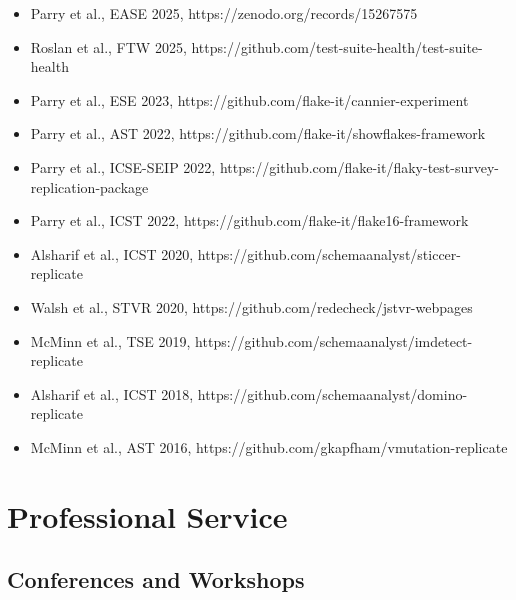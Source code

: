 \documentclass[11pt,letterpaper,sans]{moderncv}
\begin{document}
\begin{itemize} \renewcommand\labelitemi{\Large\textbullet}

  \setlength\itemsep{0.5em}

  \item Parry et al., EASE 2025, https://zenodo.org/records/15267575

  \item Roslan et al., FTW 2025, https://github.com/test-suite-health/test-suite-health

  \item Parry et al., ESE 2023, https://github.com/flake-it/cannier-experiment

  \item Parry et al., AST 2022, https://github.com/flake-it/showflakes-framework

  \item Parry et al., ICSE-SEIP 2022, https://github.com/flake-it/flaky-test-survey-replication-package

  \item Parry et al., ICST 2022, https://github.com/flake-it/flake16-framework

  \item Alsharif et al., ICST 2020, https://github.com/schemaanalyst/sticcer-replicate

  \item Walsh et al., STVR 2020, https://github.com/redecheck/jstvr-webpages

  \item McMinn et al., TSE 2019, https://github.com/schemaanalyst/imdetect-replicate

  \item Alsharif et al., ICST 2018, https://github.com/schemaanalyst/domino-replicate

  \item McMinn et al., AST 2016, https://github.com/gkapfham/vmutation-replicate

\end{itemize}

%
\vspace*{-.10in}
%
\section{Professional Service}

%
\vspace*{-.10in}
%
\subsection{{Conferences and Workshops}}
\end{document}

